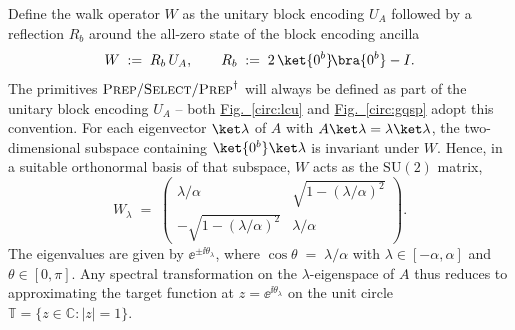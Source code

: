 Define the walk operator $W$ as the unitary block encoding $U_A$ followed by a reflection $R_b$ around the all-zero state of the block encoding ancilla \cite[Cor. 8]{motlagh2024generalized}
\begin{equation} \label{qsp-walk}
    W \;:=\; R_b\,U_A, \qquad R_b \;:=\; 2\,\ket{0^b}\!\bra{0^b} - I.
\end{equation}
The primitives $\textsc{Prep}/\textsc{Select}/\textsc{Prep}^\dagger$ will always be defined as part of the unitary block encoding $U_A$ -- both \hyperref[circ:lcu]{Fig.~\ref*{circ:lcu}} and \hyperref[circ:gqsp]{Fig.~\ref*{circ:gqsp}} adopt this convention. For each eigenvector 
$\ket\lambda$ of $A$ with $A\ket\lambda = \lambda\ket\lambda$, the two-dimensional subspace containing $\ket{0^b}\ket\lambda$ is invariant under $W$. Hence, in a suitable orthonormal basis of that subspace, $W$ acts as the $\mathrm{SU}(2)$ matrix, 
$$
W_\lambda \;=\; \begin{pmatrix} \lambda/\alpha & \sqrt{1-(\lambda/\alpha)^2} \\[2pt] -\sqrt{1-(\lambda/\alpha)^2} & \lambda/\alpha \end{pmatrix}.
$$
The eigenvalues are given by $\ee^{\pm\ii\theta_\lambda}$, where $\cos\theta \;=\; \lambda/\alpha$ with $\lambda \in [-\alpha,\alpha]$ and $\theta \in [0,\pi]$. Any spectral transformation on the $\lambda$-eigenspace of $A$ thus reduces to approximating the target function at $z = \ee^{\ii\theta_\lambda}$ on the unit circle $\mathbb{T} = \{z\in\mathbb{C} : |z|=1\}$.

